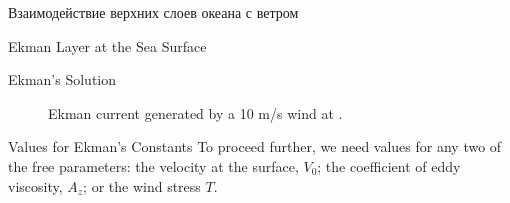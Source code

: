 \begin{chapter}{Взаимодействие верхних слоев океана с ветром}
\begin{section}{Ekman Layer at the Sea Surface}
\begin{paragraph}{Ekman's Solution}
\begin{figure}[h!]
\caption{Ekman current generated by a 10 m/s wind at .}
\label{fig:ekmancurrent}
\end{figure}
%
%
\end{paragraph}

\begin{paragraph}{Values for Ekman's Constants}
To proceed further, we need
values for any two of the free parameters: the velocity at the
surface, $V_0$; the coefficient of eddy viscosity, $A_z$; or the wind
stress $T$.
%


\end{paragraph}
\end{section}
\end{chapter}
